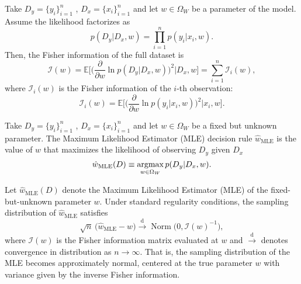 \begin{theorem}
	\label{thm:fisher_sample}
	Take $D_y= \{y_i\}_{i=1}^n$ , $D_x = \{x_i\}_{i=1}^n$ and let $w \in \Omega_W$ be a parameter of the model. Assume the likelihood factorizes as
	\begin{equation}
		p(D_y | D_x, w) = \prod_{i=1}^{n} p(y_i | x_i, w).
	\end{equation}
	Then, the Fisher information of the full dataset is
	\begin{equation}
		\mathcal{I}(w) 
		= \mathbb{E}\Bigg[\Big(\frac{\partial}{\partial w} \ln p(D_y | D_x, w)\Big)^2 \Bigg| D_x, w \Bigg] 
		= \sum_{i=1}^{n} \mathcal{I}_i(w),
	\end{equation}
	where $\mathcal{I}_i(w)$ is the Fisher information of the $i$-th observation:
	\begin{equation}
		\mathcal{I}_i(w) = \mathbb{E}\Bigg[\Bigg(\frac{\partial}{\partial w} \ln p(y_i | x_i, w)\Bigg)^2 \Bigg| x_i, w\Bigg].
	\end{equation}
\end{theorem}

\begin{definition}
	\label{def:MLE}
	Take $D_y= \{y_i\}_{i=1}^n$ , $D_x = \{x_i\}_{i=1}^n$ and let $w \in \Omega_W$ be a fixed but unknown parameter. The Maximum Likelihood Estimator (MLE) decision rule  $\hat{w}_{\mathrm{MLE}}$ is the value of $w$ that maximizes the likelihood of observing $D_y$ given $D_x$
	\begin{equation}
		\hat{w}_{\mathrm{MLE}}(D) \equiv \operatorname*{argmax}_{w \in \Omega_W} p(D_y | D_x, w).
	\end{equation}
\end{definition}

\begin{theorem}
	\label{thm:unbiased_mle}
	Let $\hat{w}_{\mathrm{MLE}}(D)$ denote the Maximum Likelihood Estimator (MLE) of the fixed-but-unknown parameter $w$. Under standard regularity conditions, the sampling distribution of $\hat{w}_{\mathrm{MLE}}$ satisfies
	\begin{equation}
		\sqrt{n}\,\big(\hat{w}_{\mathrm{MLE}} - w\big) \xrightarrow{\text{d}} \operatorname{Norm}\big(0, \mathcal{I}(w)^{-1}\big),
	\end{equation}
	where $\mathcal{I}(w)$ is the Fisher information matrix evaluated at $w$ and $\xrightarrow{\text{d}}$ denotes convergence in distribution as $n \to \infty$. 
	That is, the sampling distribution of the MLE becomes approximately normal, centered at the true parameter $w$ with variance given by the inverse Fisher information.
\end{theorem}


